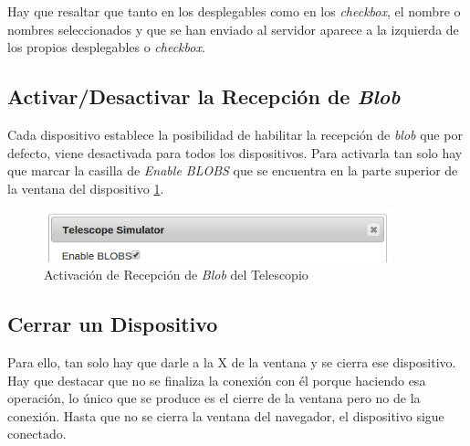 Hay que resaltar que tanto en los desplegables como en los \textit{checkbox}, el nombre o nombres seleccionados y que se han enviado al servidor aparece a la izquierda de los propios desplegables o \textit{checkbox}.

\subsection{Activar/Desactivar la Recepción de \textit{Blob}}
Cada dispositivo establece la posibilidad de habilitar la recepción de \textit{blob} que por defecto, viene desactivada para todos los dispositivos. Para activarla tan solo hay que marcar la casilla de \textit{Enable BLOBS} que se encuentra en la parte superior de la ventana del dispositivo \ref{fig:activacionBlob}.
\begin{figure}[htb]
\centering
\includegraphics[width=0.9\textwidth]{./imagenes/activacionBlob}
\caption{Activación de Recepción de \textit{Blob} del Telescopio} \label{fig:activacionBlob}
\end{figure}

\subsection{Cerrar un Dispositivo}
Para ello, tan solo hay que darle a la X de la ventana y se cierra ese dispositivo. Hay que destacar que no se finaliza la conexión con él porque haciendo esa operación, lo único que se produce es el cierre de la ventana pero no de la conexión. Hasta que no se cierra la ventana del navegador, el dispositivo sigue conectado.

